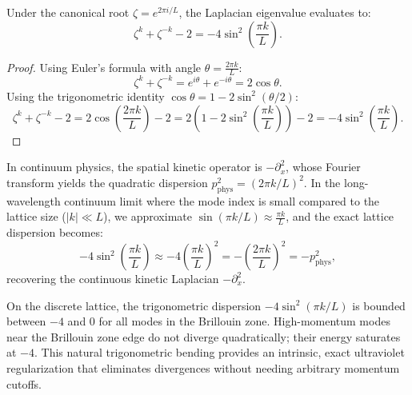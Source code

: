 \begin{corollary}
Under the canonical root $\zeta = e^{2\pi i / L}$, the Laplacian eigenvalue evaluates to:
\begin{equation}
\zeta^k + \zeta^{-k} - 2 = -4 \sin^2\left(\frac{\pi k}{L}\right).
\end{equation}
\end{corollary}

\begin{proof}
Using Euler's formula with angle $\theta = \frac{2\pi k}{L}$:
\begin{equation}
\zeta^k + \zeta^{-k} = e^{i\theta} + e^{-i\theta} = 2 \cos\theta.
\end{equation}
Using the trigonometric identity $\cos\theta = 1 - 2 \sin^2(\theta/2)$:
\begin{equation}
\zeta^k + \zeta^{-k} - 2 = 2 \cos\left(\frac{2\pi k}{L}\right) - 2 = 2 \left( 1 - 2 \sin^2\left(\frac{\pi k}{L}\right) \right) - 2 = -4 \sin^2\left(\frac{\pi k}{L}\right).
\end{equation}
\end{proof}

\begin{remark}
In continuum physics, the spatial kinetic operator is $-\partial_x^2$, whose Fourier transform yields the quadratic dispersion $p_{\mathrm{phys}}^2 = (2\pi k / L)^2$. In the long-wavelength continuum limit where the mode index is small compared to the lattice size ($|k| \ll L$), we approximate $\sin(\pi k / L) \approx \frac{\pi k}{L}$, and the exact lattice dispersion becomes:
\begin{equation}
-4 \sin^2\left(\frac{\pi k}{L}\right) \approx -4 \left(\frac{\pi k}{L}\right)^2 = -\left(\frac{2\pi k}{L}\right)^2 = -p_{\mathrm{phys}}^2,
\end{equation}
recovering the continuous kinetic Laplacian $-\partial_x^2$. 

On the discrete lattice, the trigonometric dispersion $-4 \sin^2(\pi k / L)$ is bounded between $-4$ and $0$ for all modes in the Brillouin zone. High-momentum modes near the Brillouin zone edge do not diverge quadratically; their energy saturates at $-4$. This natural trigonometric bending provides an intrinsic, exact ultraviolet regularization that eliminates divergences without needing arbitrary momentum cutoffs.
\end{remark}

